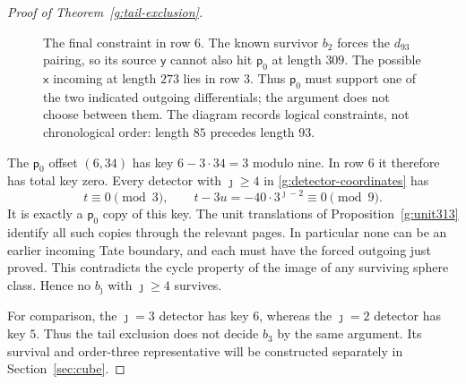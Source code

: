 \documentclass[11pt]{article}
\theoremstyle{definition}
\theoremstyle{remark}
\numberwithin{equation}{section}
\begin{document}
\begin{proof}[Proof of Theorem~\ref{g:tail-exclusion}]
\begin{figure}[htbp]
\caption{The final constraint in row $6$.  The known survivor $b_2$
forces the $d_{93}$ pairing, so its source $\mathsf y$ cannot also
hit $\mathsf p_0$ at length $309$.  The possible $\mathsf x$ incoming
at length $273$ lies in row $3$.  Thus $\mathsf p_0$ must support
one of the two indicated outgoing differentials; the argument does
not choose between them.  The diagram records logical constraints,
not chronological order: length $85$ precedes length $93$.}
\label{g:forcing-figure}
\end{figure}


The $\mathsf p_0$ offset $(6,34)$ has key
$6-3\cdot34=3$ modulo nine.  In row $6$ it
therefore has total key zero.  Every
detector with $\jmath\ge4$ in
\eqref{g:detector-coordinates} has
\[
 t\equiv0\pmod3,\qquad
 t-3u=-40\cdot3^{\jmath-2}\equiv0\pmod9.
\]
It is exactly a $\mathsf p_0$ copy of this
key.  The unit translations of
Proposition~\ref{g:unit313} identify all such
copies through the relevant pages.  In
particular none can be an earlier incoming
Tate boundary, and each must have the forced
outgoing just proved.  This contradicts the
cycle property of the image of any surviving
sphere class.  Hence no $b_{\jmath}$ with
$\jmath\ge4$ survives.

For comparison, the $\jmath=3$ detector has
key $6$, whereas the $\jmath=2$ detector has
key $5$.  Thus the tail exclusion does not
decide $b_3$ by the same argument.  Its
survival and order-three representative
will be constructed separately in
Section~\ref{sec:cube}.
\end{proof}
\end{document}
